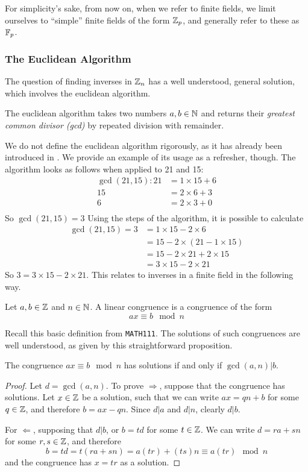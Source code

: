 For simplicity's sake, from now on, when we refer to finite fields, we limit ourselves to ``simple'' finite fields of the form $\zn[p]$, and generally refer to these as $\fp$.

\subsubsection{The Euclidean Algorithm}
The question of finding inverses in $\zn$ has a well understood, general solution, which involves the euclidean algorithm.
\begin{definition}
	The euclidean algorithm takes two numbers $a,b \in \N$ and returns their \emph{greatest common divisor (gcd)} by repeated division with remainder.
\end{definition}
We do not define the euclidean algorithm rigorously, as it has already been introduced in \cite{111-lectures}.
We provide an example of its usage as a refresher, though.
The algorithm looks as follows when applied to 21 and 15:
\begin{align*}
	\gcd(21,15):21 &= 1\times15 + 6\\
	15 &= 2\times6 + 3\\
	6 &= 2\times3 + 0\\
\end{align*}
So $\gcd(21,15)=3$
Using the steps of the algorithm, it is possible to calculate
\begin{align*}
	\gcd(21,15) = 3 &= 1\times15 - 2\times6\\
	&= 15 - 2\times(21 - 1\times15)\\
	&= 15 - 2\times21 + 2\times15\\
	&=3\times15 - 2\times21
\end{align*}
So $3 = 3\times15 - 2\times21$.
This relates to inverses in a finite field in the following way.
\begin{definition}
	Let $a,b \in \Z$ and $n \in \N$.
	A linear congruence is a congruence of the form
	$$ax \equiv b \mod n$$
\end{definition}
Recall this basic definition from \texttt{MATH111}.
The solutions of such congruences are well understood, as given by this straightforward proposition.
\begin{proposition}
	The congruence $ax \equiv b \mod n$ has solutions if and only if $\gcd(a,n)|b$.\label{congruencesolutions}
\end{proposition}
\begin{proof}
	Let $d = \gcd(a,n)$.
	To prove $\Rightarrow$, suppose that the congruence has solutions.
	Let $x \in \Z$ be a solution, such that we can write $ax = qn + b$ for some $q \in \Z$, and therefore $b = ax - qn$.
	Since $d|a$ and $d|n$, clearly $d|b$.

	For  $\Leftarrow$, supposing that $d|b$, or $b=td$ for some $t \in \Z$.
	We can write $d = ra + sn$ for some $r,s \in \Z$, and therefore
	$$b = td = t(ra + sn) = a(tr) + (ts)n \equiv a(tr) \mod n$$
	and the congruence has $x = tr$ as a solution.
\end{proof}
